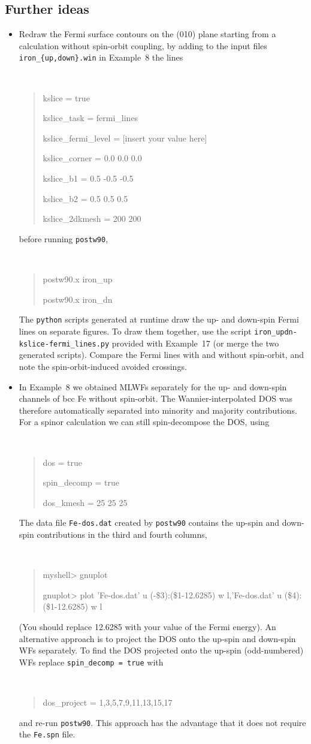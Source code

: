 \documentclass[a4paper,11pt,twoside]{article}
\begin{document}
\subsection*{Further ideas}

\begin{itemize}

\item Redraw the Fermi surface contours on the (010) plane starting
  from a calculation without spin-orbit coupling, by adding to the
  input files {\tt iron\_\{up,down\}.win} in Example~8 the lines {\tt
\begin{quote}
kslice = true

kslice\_task = fermi\_lines

kslice\_fermi\_level = [insert your value here] 

kslice\_corner = 0.0  0.0  0.0

kslice\_b1 =     0.5 -0.5 -0.5

kslice\_b2 =     0.5  0.5  0.5

kslice\_2dkmesh = 200 200
\end{quote} }
%
before running {\tt postw90},
%
{\tt
\begin{quote}
postw90.x iron\_up

postw90.x iron\_dn
\end{quote}
}
%
The {\tt python} scripts generated at runtime draw the up- and
down-spin Fermi lines on separate figures. To draw them together, use
the script {\tt iron\_updn-kslice-fermi\_lines.py} provided with
Example~17 (or merge the two generated scripts). Compare the Fermi
lines with and without spin-orbit, and note the spin-orbit-induced
avoided crossings.

\item In Example~8 we obtained MLWFs separately for the up- and down-spin
channels of bcc Fe without spin-orbit. The Wannier-interpolated DOS
was therefore automatically separated into minority and majority
contributions.  For a spinor calculation we can still spin-decompose
the DOS, using
%
{\tt
\begin{quote}
dos = true

spin\_decomp = true

dos\_kmesh = 25 25 25
\end{quote} }
%
The data file {\tt Fe-dos.dat} created by {\tt postw90} contains the
up-spin and down-spin contributions in the third and fourth columns,
%
{\tt
\begin{quote}
myshell> gnuplot

gnuplot> plot 'Fe-dos.dat' u (-\$3):(\$1-12.6285) w l,'Fe-dos.dat' u (\$4):(\$1-12.6285) w l
\end{quote} }
%
(You should replace 12.6285 with your value of the Fermi energy).  An
alternative approach is to project the DOS onto the up-spin and
down-spin WFs separately. To find the DOS projected onto the up-spin
(odd-numbered) WFs replace {\tt spin\_decomp = true} with
%
{\tt
\begin{quote}
  dos\_project = 1,3,5,7,9,11,13,15,17
\end{quote} }
%
and re-run {\tt postw90}. This approach has the advantage that it does
not require the {\tt Fe.spn} file.



\end{itemize}
\end{document}
